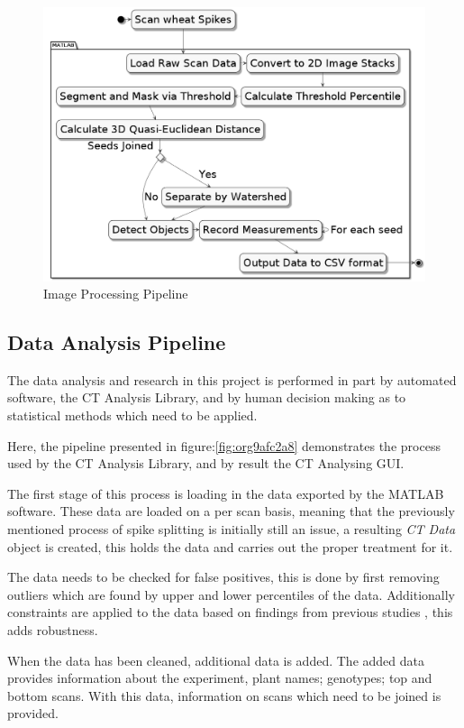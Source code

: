 \documentclass[11pt]{report}
\begin{document}
\begin{figure}[htbp]
\centering
\includegraphics[width=15cm]{./images/matlab.png}
\caption{\label{fig:orgdeecb12}
Image Processing Pipeline}
\end{figure}

\subsection{Data Analysis Pipeline}
\label{sec:org3a59523}
The data analysis and research in this project is performed in part by automated software, the CT Analysis Library, and by human decision making as to statistical methods which need to be applied.

Here, the pipeline presented in figure:\ref{fig:org9afc2a8} demonstrates the process used by the CT Analysis Library, and by result the CT Analysing GUI.

The first stage of this process is loading in the data exported by the MATLAB software. These data are loaded on a per scan basis, meaning that the previously mentioned process of spike splitting is initially still an issue, a resulting \emph{CT Data} object is created, this holds the data and carries out the proper treatment for it.

The data needs to be checked for false positives, this is done by first removing outliers which are found by upper and lower percentiles of the data. Additionally constraints are applied to the data based on findings from previous studies \cite{Hughes2017}, this adds robustness.

When the data has been cleaned, additional data is added. The added data provides information about the experiment, plant names; genotypes; top and bottom scans. With this data, information on scans which need to be joined is provided.
\end{document}
